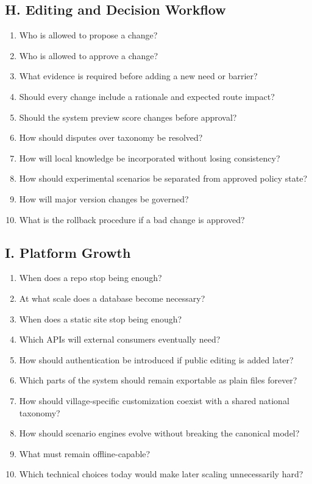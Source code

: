 \documentclass[11pt,a4paper]{article}
\begin{document}
\subsection{H. Editing and Decision Workflow}
\begin{enumerate}
    \item Who is allowed to propose a change?
    \item Who is allowed to approve a change?
    \item What evidence is required before adding a new need or barrier?
    \item Should every change include a rationale and expected route impact?
    \item Should the system preview score changes before approval?
    \item How should disputes over taxonomy be resolved?
    \item How will local knowledge be incorporated without losing consistency?
    \item How should experimental scenarios be separated from approved policy state?
    \item How will major version changes be governed?
    \item What is the rollback procedure if a bad change is approved?
\end{enumerate}

\subsection{I. Platform Growth}
\begin{enumerate}
    \item When does a repo stop being enough?
    \item At what scale does a database become necessary?
    \item When does a static site stop being enough?
    \item Which APIs will external consumers eventually need?
    \item How should authentication be introduced if public editing is added later?
    \item Which parts of the system should remain exportable as plain files forever?
    \item How should village-specific customization coexist with a shared national taxonomy?
    \item How should scenario engines evolve without breaking the canonical model?
    \item What must remain offline-capable?
    \item Which technical choices today would make later scaling unnecessarily hard?
\end{enumerate}
\end{document}
